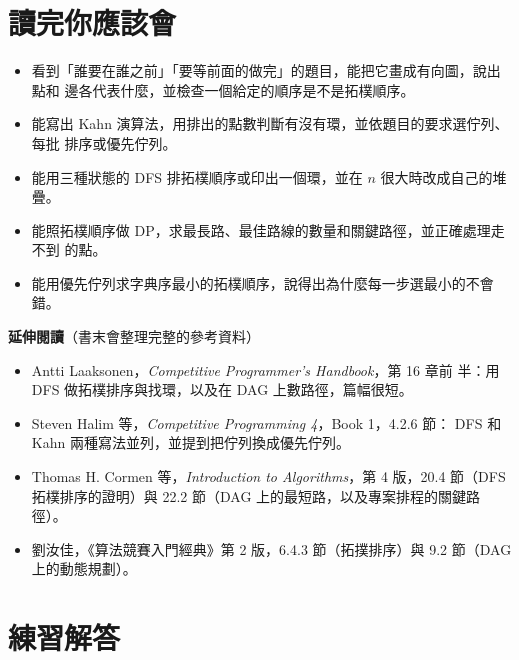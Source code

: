 \section{讀完你應該會}
\label{sec:ch18-checklist}

\begin{itemize}
\item 看到「誰要在誰之前」「要等前面的做完」的題目，能把它畫成有向圖，說出點和
邊各代表什麼，並檢查一個給定的順序是不是拓樸順序。
\item 能寫出 Kahn 演算法，用排出的點數判斷有沒有環，並依題目的要求選佇列、每批
排序或優先佇列。
\item 能用三種狀態的 DFS 排拓樸順序或印出一個環，並在 $n$ 很大時改成自己的堆
疊。
\item 能照拓樸順序做 DP，求最長路、最佳路線的數量和關鍵路徑，並正確處理走不到
的點。
\item 能用優先佇列求字典序最小的拓樸順序，說得出為什麼每一步選最小的不會錯。
\end{itemize}

\textbf{延伸閱讀}（書末會整理完整的參考資料）

\begin{itemize}
\item Antti Laaksonen，\textit{Competitive Programmer's Handbook}，第 16 章前
半：用 DFS 做拓樸排序與找環，以及在 DAG 上數路徑，篇幅很短。
\item Steven Halim 等，\textit{Competitive Programming 4}，Book 1，4.2.6 節：
DFS 和 Kahn 兩種寫法並列，並提到把佇列換成優先佇列。
\item Thomas H. Cormen 等，\textit{Introduction to Algorithms}，第 4 版，20.4
節（DFS 拓樸排序的證明）與 22.2 節（DAG 上的最短路，以及專案排程的關鍵路徑）。
\item 劉汝佳，《算法競賽入門經典》第 2 版，6.4.3 節（拓撲排序）與 9.2 節（DAG
上的動態規劃）。
\end{itemize}

\section*{練習解答}

